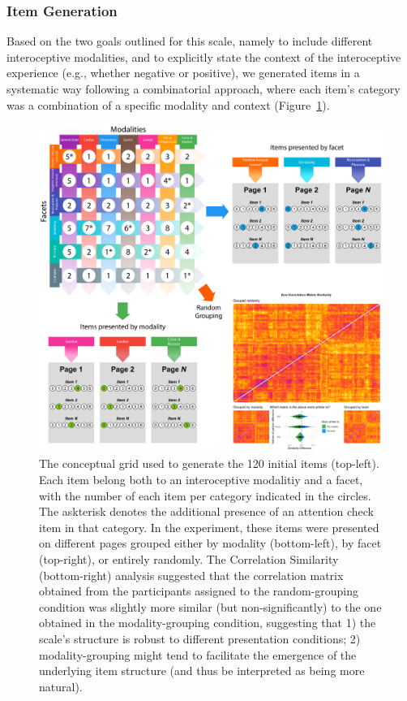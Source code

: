 \documentclass[
  jou,
  floatsintext,
  longtable,
  nolmodern,
  notxfonts,
  notimes,
  colorlinks=true,linkcolor=blue,citecolor=blue,urlcolor=blue]{apa7}
\begin{document}
\subsubsection{Item Generation}\label{item-generation}

Based on the two goals outlined for this scale, namely to include
different interoceptive modalities, and to explicitly state the context
of the interoceptive experience (e.g., whether negative or positive), we
generated items in a systematic way following a combinatorial approach,
where each item's category was a combination of a specific modality and
context (Figure~\ref{fig-one}).

\begin{figure}[!htbp]

{\caption{{The conceptual grid used to generate the 120 initial items
(top-left). Each item belong both to an interoceptive modalitiy and a
facet, with the number of each item per category indicated in the
circles. The askterisk denotes the additional presence of an attention
check item in that category. In the experiment, these items were
presented on different pages grouped either by modality (bottom-left),
by facet (top-right), or entirely randomly. The Correlation Similarity
(bottom-right) analysis suggested that the correlation matrix obtained
from the participants assigned to the random-grouping condition was
slightly more similar (but non-significantly) to the one obtained in the
modality-grouping condition, suggesting that 1) the scale's structure is
robust to different presentation conditions; 2) modality-grouping might
tend to facilitate the emergence of the underlying item structure (and
thus be interpreted as being more natural).}{\label{fig-one}}}}

\begin{center}
\includegraphics[width=1\linewidth,height=\textheight,keepaspectratio]{../study1/analysis/figures/figure1.png}
\end{center}

\end{figure}
\end{document}
